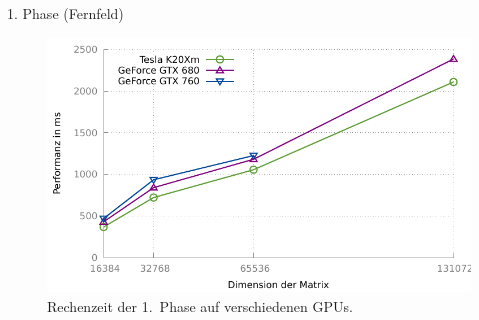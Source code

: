 \documentclass[10pt]{beamer}
\begin{document}
\begin{frame}{1. Phase (Fernfeld)}
  \begin{figure}
    \centering
    \includegraphics[width=\linewidth]{figures/fg-performance-ff.pdf}
    \caption{Rechenzeit der 1.~Phase auf verschiedenen GPUs.}
  \end{figure}
\end{frame}
\end{document}
